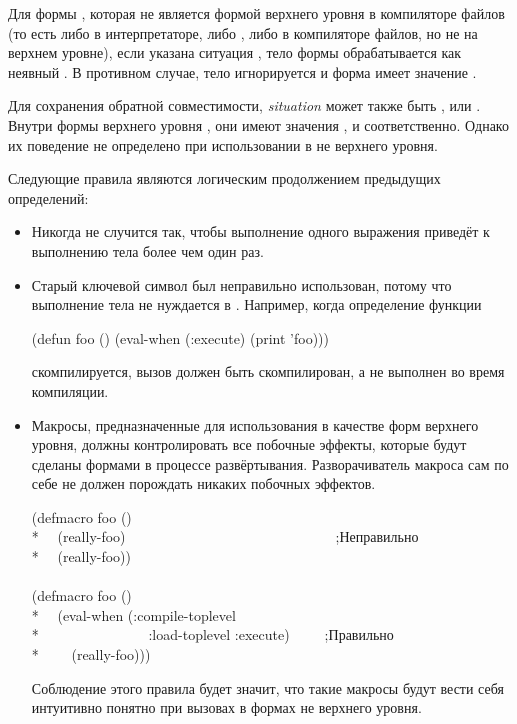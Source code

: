 \begin{defspec}
Для формы , которая не является формой верхнего уровня в
компиляторе файлов (то есть либо в интерпретаторе, либо , либо в
компиляторе файлов, но не на верхнем уровне), если указана ситуация
, тело формы обрабатывается как неявный . В противном
случае, тело игнорируется и форма  имеет значение .

Для сохранения обратной совместимости, \emph{situation} может также быть
,  или .
Внутри формы верхнего уровня , они имеют значения
,  и  соответственно.
Однако их поведение не определено при использовании в  не
верхнего уровня.

Следующие правила являются логическим продолжением предыдущих определений:

\begin{itemize}

\item Никогда не случится так, чтобы выполнение одного 
  выражения приведёт к выполнению тела более чем один раз.

\item Старый ключевой символ  был неправильно использован, потому
  что выполнение тела не нуждается в . Например, когда определение
  функции
  \begin{lisp}
    (defun foo () (eval-when (:execute) (print 'foo)))
  \end{lisp}
  скомпилируется,
  вызов  должен быть скомпилирован, а не выполнен во время
  компиляции.

\item Макросы, предназначенные для использования в качестве форм верхнего
  уровня, должны контролировать все побочные эффекты, которые будут сделаны
  формами в процессе развёртывания.
  Разворачиватель макроса сам по себе не должен порождать никаких побочных
  эффектов.
  
  \begin{lisp}
    (defmacro foo () \\*
    ~~(really-foo)~~~~~~~~~~~~~~~~~~~~~~~~~~~~~~;\textrm{Неправильно}\\*
    ~~{\Xbq}(really-foo)) \\
    \\
    (defmacro foo () \\*
    ~~{\Xbq}(eval-when (:compile-toplevel \\*
    ~~~~~~~~~~~~~~~:load-toplevel :execute)~~~~~;\textrm{Правильно} \\*
    ~~~~(really-foo)))
  \end{lisp}
  Соблюдение этого правила будет значит, что такие макросы будут вести себя
  интуитивно понятно при вызовах в формах не верхнего уровня.


\end{itemize}
\end{defspec}
